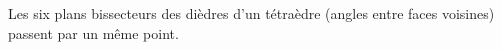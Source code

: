 Les six plans bissecteurs des dièdres d'un tétraèdre (angles entre faces voisines) passent par un même point.
